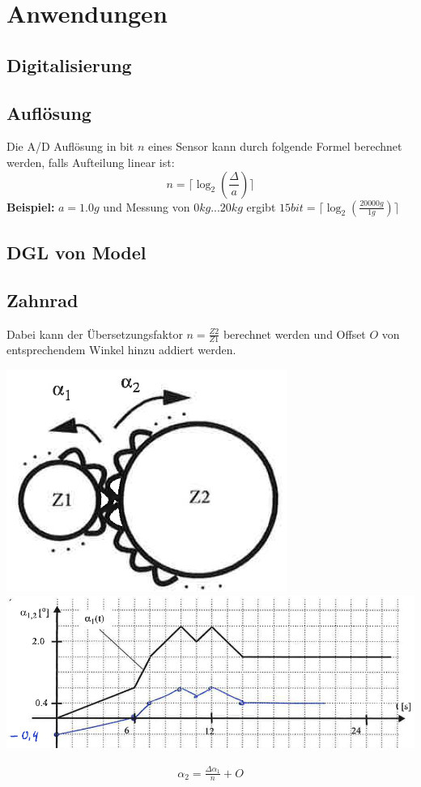 \section{Anwendungen}
\subsection{Digitalisierung}
\subsection{Auflösung}
Die A/D Auflösung in bit $n$ eines Sensor kann durch folgende Formel berechnet werden, falls Aufteilung linear ist:
\[
n = \lceil \log_2\left(\frac{\Delta}{a}\right) \rceil
\]
\textbf{Beispiel:}
$a = 1.0g$ und Messung von $0kg...20kg$ ergibt $15bit = \lceil \log_2\left(\frac{20000g}{1g}\right) \rceil$

\subsection{DGL von Model}

\subsection{Zahnrad}
Dabei kann der Übersetzungsfaktor $n = \frac{Z2}{Z1}$ berechnet werden und Offset $O$ von entsprechendem Winkel hinzu addiert werden.
\begin{center}
	\begin{minipage}{0.35\textwidth}
		\begin{center}
			\includegraphics[width=0.25\linewidth,keepaspectratio=true]{Images/zahnrad_I}
			\includegraphics[width=0.5\linewidth,keepaspectratio=true]{Images/zahnrad_I1}
		\end{center}
	\end{minipage}%
	\begin{minipage}{0.15\textwidth}
		\begin{align*}
			\alpha_2 = \frac{\Delta \alpha_1}{n} + O
		\end{align*}
	\end{minipage}
\end{center}

